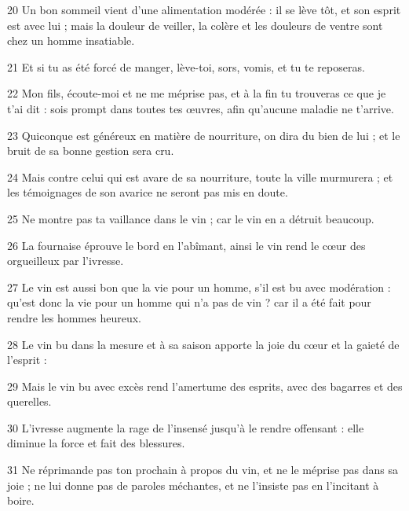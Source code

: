 \par 20 Un bon sommeil vient d'une alimentation modérée : il se lève tôt, et son esprit est avec lui ; mais la douleur de veiller, la colère et les douleurs de ventre sont chez un homme insatiable.
\par 21 Et si tu as été forcé de manger, lève-toi, sors, vomis, et tu te reposeras.
\par 22 Mon fils, écoute-moi et ne me méprise pas, et à la fin tu trouveras ce que je t'ai dit : sois prompt dans toutes tes œuvres, afin qu'aucune maladie ne t'arrive.
\par 23 Quiconque est généreux en matière de nourriture, on dira du bien de lui ; et le bruit de sa bonne gestion sera cru.
\par 24 Mais contre celui qui est avare de sa nourriture, toute la ville murmurera ; et les témoignages de son avarice ne seront pas mis en doute.
\par 25 Ne montre pas ta vaillance dans le vin ; car le vin en a détruit beaucoup.
\par 26 La fournaise éprouve le bord en l'abîmant, ainsi le vin rend le cœur des orgueilleux par l'ivresse.
\par 27 Le vin est aussi bon que la vie pour un homme, s'il est bu avec modération : qu'est donc la vie pour un homme qui n'a pas de vin ? car il a été fait pour rendre les hommes heureux.
\par 28 Le vin bu dans la mesure et à sa saison apporte la joie du cœur et la gaieté de l'esprit :
\par 29 Mais le vin bu avec excès rend l'amertume des esprits, avec des bagarres et des querelles.
\par 30 L'ivresse augmente la rage de l'insensé jusqu'à le rendre offensant : elle diminue la force et fait des blessures.
\par 31 Ne réprimande pas ton prochain à propos du vin, et ne le méprise pas dans sa joie ; ne lui donne pas de paroles méchantes, et ne l'insiste pas en l'incitant à boire.


